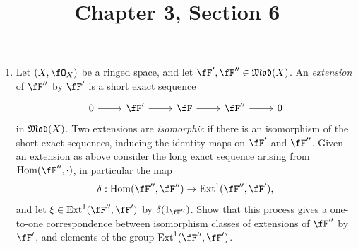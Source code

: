 \documentclass[a4paper]{article}
\title{Chapter 3, Section 6}
\begin{document}
\maketitle

\begin{enumerate} [label=\textbf{\arabic*.}, leftmargin=0em]

  \item[\textbf{1.}] Let $(X, \fO_X)$ be a ringed space, and let $\fF', \fF'' \in \goth{Mod}(X)$. An \textit{extension} of $\fF''$ by $\fF'$ is a short exact sequence
        \[ \begin{tikzcd}
            0 \arrow[r] & \fF' \arrow[r] & \fF \arrow[r] & \fF'' \arrow[r] & 0
          \end{tikzcd} \]
        in $\mathfrak{Mod}(X)$. Two extensions are \textit{isomorphic} if there is an isomorphism of the short exact sequences, inducing the identity maps on $\fF'$ and $\fF''$. Given an extension as above consider the long exact sequence arising from $\Hom(\fF'', \cdot)$, in particular the map
        \begin{equation*}
          \delta : \Hom(\fF'', \fF'') \to \Ext^1(\fF'', \fF'),
        \end{equation*}
        and let $\xi \in \Ext^1(\fF'', \fF')$ by $\delta(1_{\fF''})$. Show that this process gives a one-to-one correspondence between isomorphism classes of extensions of $\fF''$ by $\fF'$, and elements of the group $\Ext^1(\fF'', \fF')$.


\end{enumerate}
\end{document}
